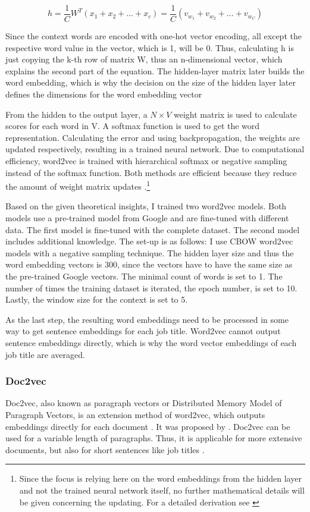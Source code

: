 \documentclass[12pt, a4paper, titlepage]{article}
\begin{document}
\[ h = \frac{1}{C} W^T(x_1 + x_2 + ... +x_c) = \frac{1}{C}(v_{w_1} + v_{w_2} + ... + v_{w_C}) \]

Since the context words are encoded with one-hot vector encoding, all except the respective word value in the vector, which is 1, will be 0. Thus, calculating h is just copying the k-th row of matrix W, thus an n-dimensional vector, which explains the second part of the equation. The hidden-layer matrix later builds the word embedding, which is why the decision on the size of the hidden layer later defines the dimensions for the word embedding vector \citep{rong2014}

From the hidden to the output layer, a $N \times V$ weight matrix is used to calculate scores for each word in V. A softmax function is used to get the word representation. Calculating the error and using backpropagation, the weights are updated respectively, resulting in a trained neural network. Due to computational efficiency, word2vec is trained with hierarchical softmax or negative sampling instead of the softmax function. Both methods are efficient because they reduce the amount of weight matrix updates \citep{rong2014, simonton2017}.\footnote{Since the focus is relying here on the word embeddings from the hidden layer and not the trained neural network itself, no further mathematical details will be given concerning the updating. For a detailed derivation see \citep{rong2014}}

Based on the given theoretical insights, I trained two word2vec models. Both models use a pre-trained model from Google and are fine-tuned with different data. The first model is fine-tuned with the complete dataset. The second model includes additional knowledge. The set-up is as follows: I use \ac{CBOW} word2vec models with a negative sampling technique. The hidden layer size and thus the word embedding vectors is 300, since the vectors have to have the same size as the pre-trained Google vectors. The minimal count of words is set to 1. The number of times the training dataset is iterated, the epoch number, is set to 10. Lastly, the window size for the context is set to 5. 

As the last step, the resulting word embeddings need to be processed in some way to get sentence embeddings for each job title. Word2vec cannot output sentence embeddings directly, which is why the word vector embeddings of each job title are averaged. 

\subsubsection*{Doc2vec}
Doc2vec, also known as paragraph vectors or Distributed Memory Model of Paragraph Vectors, is an extension method of word2vec, which outputs embeddings directly for each document \citep{lau2016}. It was proposed by \cite{le2014}. Doc2vec can be used for a variable length of paragraphs. Thus, it is applicable for more extensive documents, but also for short sentences like job titles \citep{le2014}. 
\end{document}
